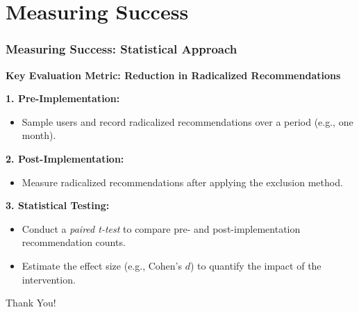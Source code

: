 \documentclass[
	11pt, %
]{beamer}
\begin{document}
\section{Measuring Success}
\begin{frame}
    \frametitle{Measuring Success: Statistical Approach}
    \textbf{Key Evaluation Metric: Reduction in Radicalized Recommendations}
    \vspace{0.2cm}
    
    \textbf{1. Pre-Implementation:}
    \begin{itemize}
        \item Sample users and record radicalized recommendations over a period (e.g., one month).
    \end{itemize}
    
    \textbf{2. Post-Implementation:}
    \begin{itemize}
        \item Measure radicalized recommendations after applying the exclusion method.
    \end{itemize}
    
    \textbf{3. Statistical Testing:}
    \begin{itemize}
        \item Conduct a \emph{paired t-test} to compare pre- and post-implementation recommendation counts.
        \item Estimate the effect size (e.g., Cohen's $d$) to quantify the impact of the intervention.
    \end{itemize}
\end{frame}


\begin{frame}[plain] %
	\begin{center}
		{\Huge Thank You!}
	\end{center}
\end{frame}

\end{document}
